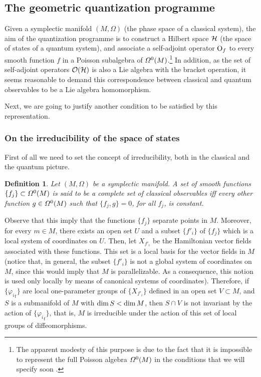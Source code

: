 \documentclass[12pt]{article}
\theoremstyle{plain}
\newtheorem{definition}{Definition}
\def\H{{\cal H}}
\def\Op{{\rm O}}
\begin{document}
\subsection{The geometric quantization programme}


Given a symplectic manifold $(M,\Omega )$ (the phase space of a
classical system),
the aim of the quantization programme is to construct a Hilbert space
$\H$
(the space of states of a quantum system),
and associate a self-adjoint operator $\Op_f$
to every smooth function $f$ in a Poisson subalgebra of
${\mit\Omega}^0(M)$.\footnote{
The apparent modesty of this purpose is due to
the fact that it is impossible to represent the full Poisson algebra
${\mit\Omega}^0(M)$ in the conditions that we will specify soon
\cite{Vh-51}.
}
In addition, as the set of self-adjoint operators
${\cal O}(\H )$ is also a Lie algebra with the bracket operation,
it seems reasonable to demand this correspondence
between classical and quantum observables to be a Lie algebra
homomorphism.

Next, we are going to justify another condition to be satisfied by this
representation.


\subsubsection{On the irreducibility of the space of states}


First of all we need to set the concept of irreducibility,
both in the classical and the quantum picture.

\begin{definition}
Let $(M,\Omega )$ be a symplectic manifold.
A set of smooth functions $\{ f_j \} \subset {\mit\Omega}^0(M)$
is said to be a {\rm complete set of classical observables}
iff every other function $g \in {\mit\Omega}^0(M)$
such that $\{ f_j,g \} = 0$, for all $f_j$, is constant.
\end{definition}

Observe that this imply that
the functions $\{ f_j \}$ separate points in $M$.
Moreover, for every $m \in M$, there exists an open set $U$
and a subset $\{ f'_i \}$ of $\{ f_j \}$ which is a local system of
coordinates on $U$.
Then, let $X_{f'_i}$ be the Hamiltonian vector fields
associated with these functions. This set is a local basis for the
vector fields in $M$
(notice that, in general, the subset $\{ f'_i \}$ is not a global
system of coordinates on $M$, since this would imply that $M$
is parallelizable. As a consequence, this notion is used only locally by
means
of canonical systems of coordinates).
Therefore, if $\{ {\varphi_i}_t \}$ are local one-parameter
groups of $\{ X_{f'_i} \}$ defined in an open set $V \subset M$,
and $S$ is a submanifold of $M$ with ${\rm dim}\, S<{\rm dim}\, M$,
then $S \cap V$ is not invariant by the action of
$\{ {\varphi_i}_t \}$, that is, $M$ is irreducible under the action of
this
set of local groups of diffeomorphisms.
\end{document}
